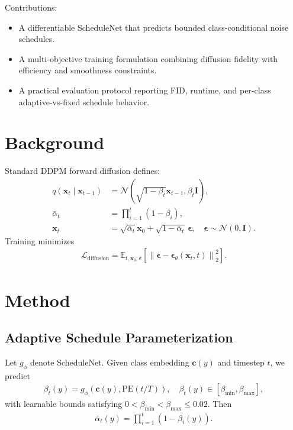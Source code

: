 Contributions:
\begin{itemize}
  \item A differentiable ScheduleNet that predicts bounded class-conditional noise schedules.
  \item A multi-objective training formulation combining diffusion fidelity with efficiency and smoothness constraints.
  \item A practical evaluation protocol reporting FID, runtime, and per-class adaptive-vs-fixed schedule behavior.
\end{itemize}

\section{Background}
Standard DDPM forward diffusion defines:
\begin{align}
q(\mathbf{x}_t \mid \mathbf{x}_{t-1}) &= \mathcal{N}\!\left(\sqrt{1-\beta_t}\mathbf{x}_{t-1}, \beta_t \mathbf{I}\right), \\
\bar{\alpha}_t &= \prod_{i=1}^{t} (1-\beta_i), \\
\mathbf{x}_t &= \sqrt{\bar{\alpha}_t}\mathbf{x}_0 + \sqrt{1-\bar{\alpha}_t}\,\boldsymbol{\epsilon}, \quad \boldsymbol{\epsilon}\sim\mathcal{N}(0,\mathbf{I}).
\end{align}
Training minimizes
\begin{align}
\mathcal{L}_{\text{diffusion}} = \mathbb{E}_{t,\mathbf{x}_0,\boldsymbol{\epsilon}}\left[\left\|\boldsymbol{\epsilon} - \boldsymbol{\epsilon}_\theta(\mathbf{x}_t,t)\right\|_2^2\right].
\end{align}

\section{Method}
\subsection{Adaptive Schedule Parameterization}
Let $g_\phi$ denote ScheduleNet. Given class embedding $\mathbf{c}(y)$ and timestep $t$, we predict
\begin{align}
\beta_t(y) = g_\phi\!\left(\mathbf{c}(y), \text{PE}(t/T)\right), \quad \beta_t(y)\in[\beta_{\min},\beta_{\max}],
\end{align}
with learnable bounds satisfying $0<\beta_{\min}<\beta_{\max}\le 0.02$.
Then
\begin{align}
\bar{\alpha}_t(y) = \prod_{i=1}^{t}\left(1-\beta_i(y)\right).
\end{align}

